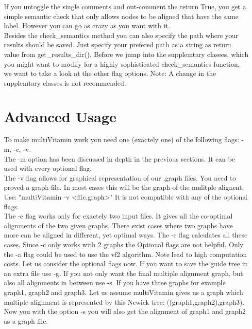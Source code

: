 \documentclass{SeminarV2}
\begin{document}
If you untoggle the single comments and out-comment the return True, you get a simple
semantic check that only allows nodes to be aligned that have the same label.
However you can go as crazy as you want with it.\\
Besides the check\_semantics method you can also specify the path where your
results should be saved. Just specify your prefered path as a string as return
value from get\_results\_dir(). Before we jump into the supplemtary clasees, which
you might want to modify for a highly sophisticated check\_semantics function, we
want to take a look at the other flag options.
Note: A change in the supplemtary classes is not recommended.
\section{Advanced Usage}
To make multiVitamin work you need one (exactely one) of the following flags:
-m, -c, -v.\\
The -m option has been discussed in depth in the previous sections. It can be used with
every optional flag.\\
The -v flag allows for graphical representation of our .graph files.
You need to proved a graph file. In most cases this will be the graph of the mulitple
alignent. Use: "multiVitamin -v <file.graph>"
It is not compatible with any of the optional flags.\\
The -c flag works only for exactely two input files.
It gives all the co-optimal alignments of the two given graphs. There exist
cases where two graphs have more can be aligned in different, yet optimal ways.
The -c flag calculates all these cases.
Since -c only works with 2 graphs the Optional flags are not helpful.
Only the -a flag could be used to use the vf2 algorithm. Note lead to high
computation costs.
Let us consider the optional flags now.
If you want to save the guide tree in an extra file use -g.
If you not only want the final multiple alignment graph, but also
all alignments in between use -s. If you have three graphs for example graph1, graph2
and graph3. Let us assume multiVitamin gives us a graph which multiple alignment
is represented by this Newick tree: ((graph1,graph2),graph3). Now you
with the option -s you will also get the alignment of graph1 and graph2 as a graph file.\\
\end{document}
